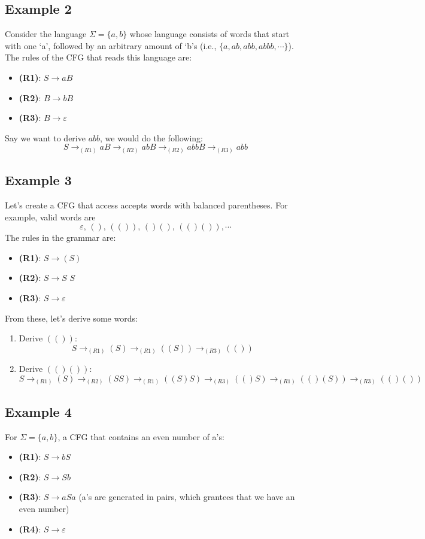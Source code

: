 \documentclass{report}
\begin{document}
\subsection{Example 2}
Consider the language $\Sigma = \{a,b\}$ whose language consists of words that start with one `a', followed by an arbitrary amount of `b's (i.e., $\{a, ab, abb, abbb, \cdots\}$). The rules of the CFG that reads this language are:
\begin{itemize}
\item \textbf{(R1)}: $S \rightarrow aB$
\item \textbf{(R2)}: $B \rightarrow bB$
\item \textbf{(R3)}: $B \rightarrow \varepsilon$
\end{itemize}
Say we want to derive $abb$, we would do the following:
$$S \rightarrow_{(R1)} aB \rightarrow_{(R2)} abB \rightarrow_{(R2)} abbB \rightarrow_{(R3)} abb$$
\subsection{Example 3}
Let's create a CFG that access accepts words with balanced parentheses. For example, valid words are
$$\varepsilon, \, (), \, (()),\, ()(),\, (()()), \cdots$$
The rules in the grammar are:
\begin{itemize}
\item \textbf{(R1)}: $S \rightarrow (S)$
\item \textbf{(R2)}: $S \rightarrow S \,\, S$
\item \textbf{(R3)}: $S \rightarrow \varepsilon$
\end{itemize}
From these, let's derive some words:
\begin{enumerate}
\item Derive $(())$: 
$$S \rightarrow_{(R1)} (S) \rightarrow_{(R1)} ((S)) \rightarrow_{(R3)} (())$$
\item Derive $(()())$:
$$S \rightarrow_{(R1)} (S) \rightarrow_{(R2)} (S S) \rightarrow_{(R1)} ((S) S ) \rightarrow_{(R3)} (() S) \rightarrow_{(R1)} (() (S)) \rightarrow_{(R3)} (()())$$
\end{enumerate}
\subsection{Example 4}
For $\Sigma = \{a,b\}$, a CFG that contains an even number of a's:
\begin{itemize}
\item \textbf{(R1)}: $S \rightarrow bS$
\item \textbf{(R2)}: $S \rightarrow Sb$
\item \textbf{(R3)}: $S \rightarrow aSa$ (a's are generated in pairs, which grantees that we have an even number)
\item \textbf{(R4)}: $S \rightarrow \varepsilon$
\end{itemize}
\end{document}
